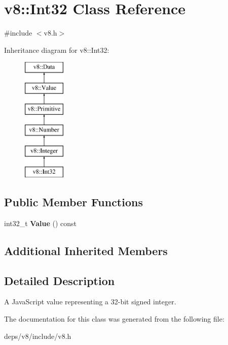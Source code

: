 \hypertarget{classv8_1_1_int32}{}\section{v8\+:\+:Int32 Class Reference}
\label{classv8_1_1_int32}


{\ttfamily \#include $<$v8.\+h$>$}

Inheritance diagram for v8\+:\+:Int32\+:\begin{figure}[H]
\begin{center}
\leavevmode
\includegraphics[height=6.000000cm]{classv8_1_1_int32}
\end{center}
\end{figure}
\subsection*{Public Member Functions}
\begin{DoxyCompactItemize}
\item 
\hypertarget{classv8_1_1_int32_a74860c6a524e1fb3f7b685ab0896be4b}{}int32\+\_\+t {\bfseries Value} () const \label{classv8_1_1_int32_a74860c6a524e1fb3f7b685ab0896be4b}

\end{DoxyCompactItemize}
\subsection*{Additional Inherited Members}


\subsection{Detailed Description}
A Java\+Script value representing a 32-\/bit signed integer. 

The documentation for this class was generated from the following file\+:\begin{DoxyCompactItemize}
\item 
deps/v8/include/v8.\+h\end{DoxyCompactItemize}
